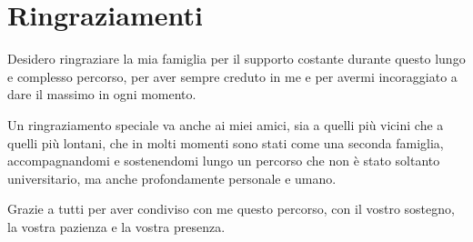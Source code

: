 \cleardoublepage
\chapter*{Ringraziamenti}
\thispagestyle{empty}

Desidero ringraziare la mia famiglia per il supporto costante durante questo lungo e complesso percorso, per aver sempre creduto in me e per avermi incoraggiato a dare il massimo in ogni momento.

Un ringraziamento speciale va anche ai miei amici, sia a quelli più vicini che a quelli più lontani, che in molti momenti sono stati come una seconda famiglia, accompagnandomi e sostenendomi lungo un percorso che non è stato soltanto universitario, ma anche profondamente personale e umano.

Grazie a tutti per aver condiviso con me questo percorso, con il vostro sostegno, la vostra pazienza e la vostra presenza.


\cleardoublepage